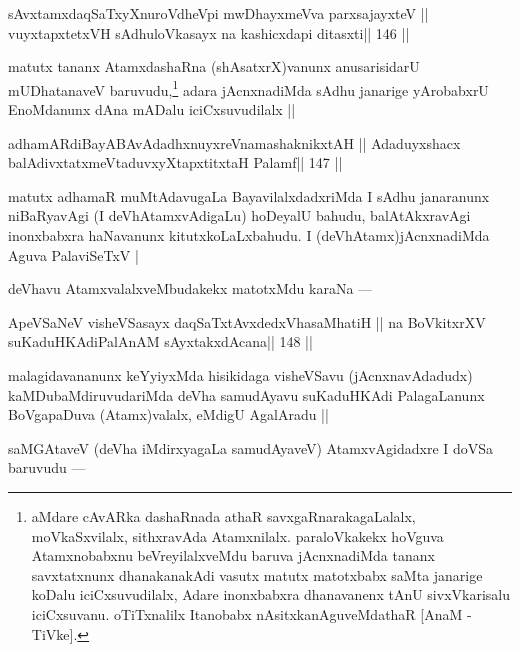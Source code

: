 \begin{shl}
sAvxtamxdaqSaTxyXnuroVdheV\s pi mwDhayxmeVva parxsajayxteV ||
vuyxtapxtetxVH sAdhuloVkasayx na kashicxdapi ditasxti\hfill || 146 ||
\end{shl}

\begin{artha}
matutx tananx AtamxdashaRna (shAsatxrX)vanunx anusarisidarU mUDhatanaveV baruvudu,\footnote[6]{aMdare cAvARka dashaRnada athaR savxgaRnarakagaLalalx, moVkaSxvilalx, sithxravAda Atamxnilalx. paraloVkakekx hoVguva Atamxnobabxnu beVreyilalxveMdu baruva jAcnxnadiMda tananx savxtatxnunx dhanakanakAdi vasutx matutx matotxbabx saMta janarige koDalu iciCxsuvudilalx, Adare inonxbabxra dhanavanenx tAnU sivxVkarisalu iciCxsuvanu. oTiTxnalilx Itanobabx nAsitxkanAguveMdathaR [AnaM - TiVke].} adara jAcnxnadiMda sAdhu janarige yArobabxrU EnoMdanunx dAna mADalu iciCxsuvudilalx ||
\end{artha}

\begin{shl}
adhamARdiBayABAvAdadhxnuyxreVnamashaknikxtAH ||
Adaduyxshacx balAdivxtatxmeVtaduvxyXtapxtitxtaH Palamf\hfill || 147 ||
\end{shl}

\begin{artha}
matutx adhamaR muMtAdavugaLa BayavilalxdadxriMda I sAdhu janaranunx niBaRyavAgi (I deVhAtamxvAdigaLu) hoDeyalU bahudu, balAtAkxravAgi inonxbabxra haNavanunx kitutxkoLaLxbahudu. I (deVhAtamx)jAcnxnadiMda Aguva PalaviSeTxV |
\end{artha}

\begin{artha}
deVhavu AtamxvalalxveMbudakekx matotxMdu karaNa ---
\end{artha}

\begin{shl}
ApeVSaNeV visheVSasayx daqSaTxtAvxdedxVhasaMhatiH ||
na BoVkitxrXV suKaduHKAdiPalAnAM sAyxtakxdAcana\hfill || 148 ||
\end{shl}

\begin{artha}
malagidavananunx keYyiyxMda hisikidaga visheVSavu (jAcnxnavAdadudx) kaMDubaMdiruvudariMda deVha samudAyavu suKaduHKAdi PalagaLanunx BoVgapaDuva (Atamx)valalx, eMdigU AgalAradu ||
\end{artha}

\begin{artha}
saMGAtaveV (deVha iMdirxyagaLa samudAyaveV) AtamxvAgidadxre I doVSa baruvudu ---
\end{artha}

